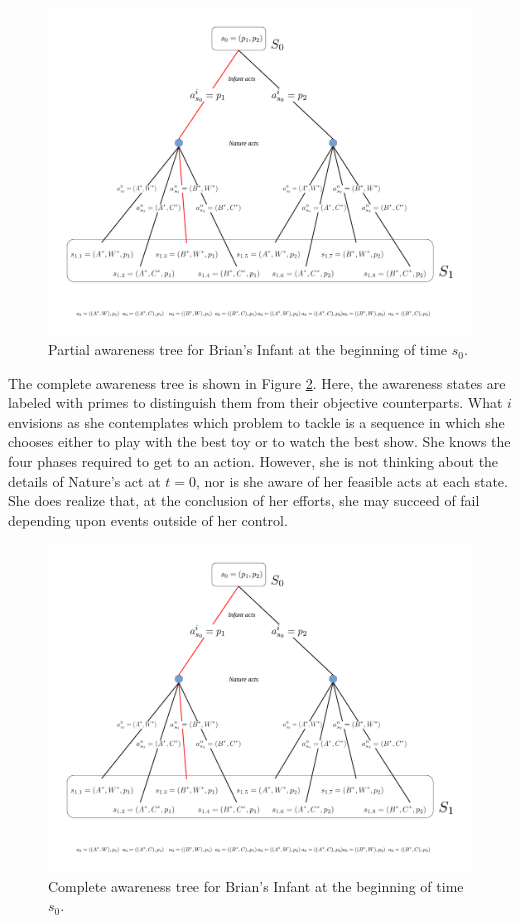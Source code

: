 \documentclass[
11pt,
titlepage,
reqno,
]{article}%
\theoremstyle{definition}
\begin{document}
\begin{figure}[h!]
	\centering
	\includegraphics*[page=5,trim = 0in 1in 0in 0in,scale=.6]{Awareness_Diagrams_All}
	\caption{Partial awareness tree for Brian's Infant at the beginning of time $s_{0}$.\label{Diag: p-05}}%
\end{figure}

The complete awareness tree is shown in Figure \ref{Diag: p-06}.
Here, the awareness states are labeled with primes to distinguish them from their objective counterparts.
What $i$ envisions as she contemplates which problem to tackle is a sequence in which she chooses either to play with the best toy or to watch the best show.
She knows the four phases required to get to an action.
However, she is not thinking about the details of Nature's act at $t=0$, nor is she aware of her feasible acts at each state.
She does realize that, at the conclusion of her efforts, she may succeed of fail depending upon events outside of her control.

\begin{figure}[h!]
	\centering
	\includegraphics*[page=6,trim = 0in .5in 5in 0in,scale=.7]{Awareness_Diagrams_All}
	\caption{Complete awareness tree for Brian's Infant at the beginning of time $s_{0}$.\label{Diag: p-06}}%
\end{figure}
\end{document}
